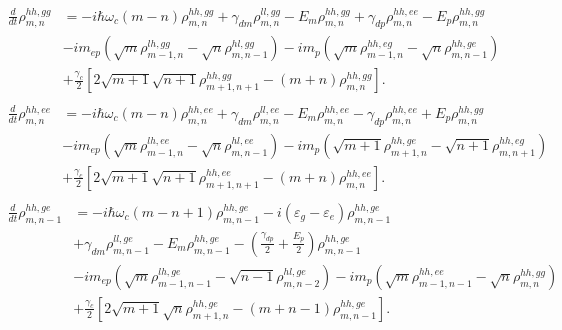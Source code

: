 \documentclass[aps,prb,
superscriptaddress,
,floatfix,footinbib,longbibliography,
preprint
]{revtex4-2}
\begin{document}
\begin{equation}
\begin{split}
\frac{d}{dt}\rho_{m,n}^{hh,gg}&=-i\hbar\omega_{c}(m-n)\rho_{m,n}^{hh,gg}+\gamma_{dm}\rho_{m,n}^{ll,gg}
-E_{m}\rho_{m,n}^{hh,gg}
+\gamma_{dp}\rho_{m,n}^{hh,ee}-E_{p}\rho_{m,n}^{hh,gg}\\
&-im_{ep}(\sqrt{m}\rho_{m-1,n}^{lh,gg}-\sqrt{n}\rho_{m,n-1}^{hl,gg})
-im_{p}(\sqrt{m}\rho_{m-1,n}^{hh,eg}-\sqrt{n}\rho_{m,n-1}^{hh,ge})\\
&+\frac{\gamma_{c}}{2}[2\sqrt{m+1}\sqrt{n+1}\rho_{m+1,n+1}^{hh,gg}-(m+n)\rho_{m,n}^{hh,gg}].\\
\end{split}
\label{hh,gg}
\end{equation}
%
\begin{equation}
\begin{split}
\frac{d}{dt}\rho_{m,n}^{hh,ee}&=-i\hbar\omega_{c}(m-n)\rho_{m,n}^{hh,ee}+\gamma_{dm}\rho_{m,n}^{ll,ee}
-E_{m}\rho_{m,n}^{hh,ee}-\gamma_{dp}\rho_{m,n}^{hh,ee}+E_{p}\rho_{m,n}^{hh,gg}\\
&-im_{ep}(\sqrt{m}\rho_{m-1,n}^{lh,ee}-\sqrt{n}\rho_{m,n-1}^{hl,ee})
-im_{p}(\sqrt{m+1}\rho_{m+1,n}^{hh,ge}-\sqrt{n+1}\rho_{m,n+1}^{hh,eg})\\
&+\frac{\gamma_{c}}{2}[2\sqrt{m+1}\sqrt{n+1}\rho_{m+1,n+1}^{hh,ee}-(m+n)\rho_{m,n}^{hh,ee}].\\
\end{split}
\label{hh,ee}
\end{equation}
%
\begin{equation}
\begin{split}
\frac{d}{dt}\rho_{m,n-1}^{hh,ge}&=-i\hbar\omega_{c}(m-n+1)\rho_{m,n-1}^{hh,ge}
-i(\varepsilon_{g}-\varepsilon_{e})\rho_{m,n-1}^{hh,ge}\\
&+\gamma_{dm}\rho_{m,n-1}^{ll,ge}
-E_{m}\rho_{m,n-1}^{hh,ge}-(\frac{\gamma_{dp}}{2}+\frac{E_{p}}{2})\rho_{m,n-1}^{hh,ge}\\
&-im_{ep}(\sqrt{m}\rho_{m-1,n-1}^{lh,ge}-\sqrt{n-1}\rho_{m,n-2}^{hl,ge})
-im_{p}(\sqrt{m}\rho_{m-1,n-1}^{hh,ee}-\sqrt{n}\rho_{m,n}^{hh,gg})\\
&+\frac{\gamma_{c}}{2}[2\sqrt{m+1}\sqrt{n}\rho_{m+1,n}^{hh,ge}-(m+n-1)\rho_{m,n-1}^{hh,ge}].\\
\end{split}
\label{hh,ge}
\end{equation}
%
\end{document}
